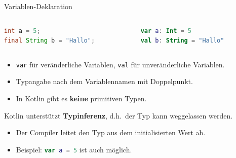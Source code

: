 \documentclass{beamer}
\begin{document}
\begin{frame}[fragile]{Variablen-Deklaration}
  \begin{columns}
    \begin{column}{0.5\textwidth}
      \begin{lstlisting}[language=Java, title=Java, xleftmargin=1em]
int a = 5;
final String b = "Hallo";
      \end{lstlisting}
    \end{column}
    \begin{column}{0.5\textwidth}
      \begin{lstlisting}[language=Kotlin, title=Kotlin, xleftmargin=1em, numbers=none]
var a: Int = 5
val b: String = "Hallo"
      \end{lstlisting}
    \end{column}
  \end{columns}
  \vspace{0.5cm}
  \begin{itemize}[<+->]
    \item \texttt{var} für veränderliche Variablen, \texttt{val} für unveränderliche Variablen.
    \item Typangabe nach dem Variablennamen mit Doppelpunkt.
    \item In Kotlin gibt es \textbf{keine} primitiven Typen. %
  \end{itemize}
  \pause\vspace{0.5cm}
  Kotlin unterstützt \textbf{Typinferenz}, d.h.\ der Typ kann weggelassen werden.
  \begin{itemize}
    \item Der Compiler leitet den Typ aus dem initialisierten Wert ab.
    \item Beispiel: \lstinline[language=kotlin]|var a = 5| ist auch möglich. %
  \end{itemize}
\end{frame}
\end{document}
